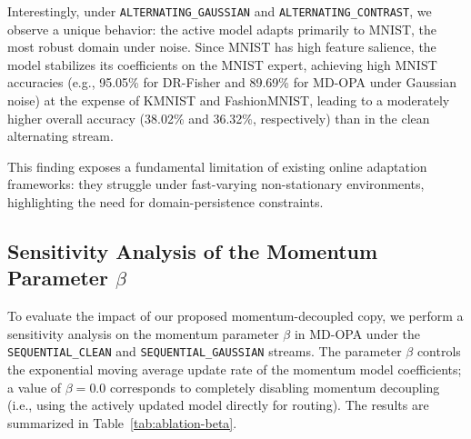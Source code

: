 \documentclass{article}
\theoremstyle{plain}
\theoremstyle{definition}
\theoremstyle{remark}
\begin{document}
Interestingly, under \texttt{ALTERNATING\_GAUSSIAN} and \texttt{ALTERNATING\_CONTRAST}, we observe a unique behavior: the active model adapts primarily to MNIST, the most robust domain under noise. Since MNIST has high feature salience, the model stabilizes its coefficients on the MNIST expert, achieving high MNIST accuracies (e.g., 95.05\% for DR-Fisher and 89.69\% for MD-OPA under Gaussian noise) at the expense of KMNIST and FashionMNIST, leading to a moderately higher overall accuracy (38.02\% and 36.32\%, respectively) than in the clean alternating stream.

This finding exposes a fundamental limitation of existing online adaptation frameworks: they struggle under fast-varying non-stationary environments, highlighting the need for domain-persistence constraints.

\subsection{Sensitivity Analysis of the Momentum Parameter $\beta$}
To evaluate the impact of our proposed momentum-decoupled copy, we perform a sensitivity analysis on the momentum parameter $\beta$ in MD-OPA under the \texttt{SEQUENTIAL\_CLEAN} and \texttt{SEQUENTIAL\_GAUSSIAN} streams. The parameter $\beta$ controls the exponential moving average update rate of the momentum model coefficients; a value of $\beta = 0.0$ corresponds to completely disabling momentum decoupling (i.e., using the actively updated model directly for routing). The results are summarized in Table~\ref{tab:ablation-beta}.
\end{document}
